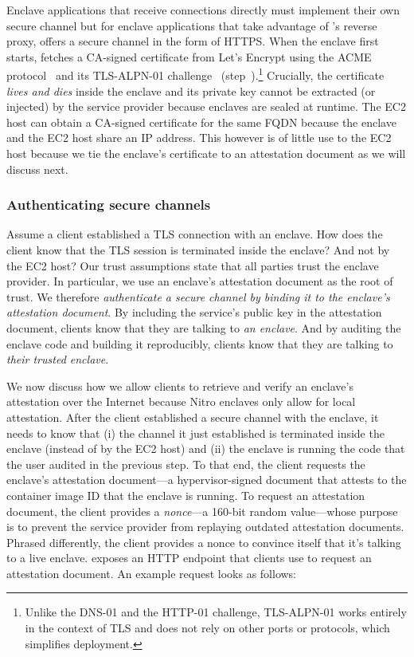 Enclave applications that receive connections directly must implement their own
secure channel but for enclave applications that take advantage of \tool{}'s
reverse proxy, \tool{} offers a secure channel in the form of HTTPS.  When the
enclave first starts, \tool{} fetches a CA-signed certificate from Let's Encrypt
using the ACME protocol~\cite{acme-protocol} and its TLS-ALPN-01
challenge~\cite{tls-alpn} (step~).\footnote{Unlike the DNS-01 and the
HTTP-01 challenge, TLS-ALPN-01 works entirely in the context of TLS and does not
rely on other ports or protocols, which simplifies deployment.}  Crucially, the
certificate \emph{lives and dies} inside the enclave and its private key cannot
be extracted (or injected) by the service provider because enclaves are sealed
at runtime.
%
The EC2 host can obtain a CA-signed certificate for the same FQDN because the
enclave and the EC2 host share an IP address.  This however is of little use to
the EC2 host because we tie the enclave's certificate to an attestation
document as we will discuss next.

\subsubsection{Authenticating secure channels}
\label{sec:attestation}

Assume a client established a TLS connection with an enclave.  How does the
client know that the TLS session is terminated inside the enclave?  And not by
the EC2 host?  Our trust assumptions state that all parties trust the enclave
provider.  In particular, we use an enclave's attestation document as the root
of trust.  We therefore \emph{authenticate a secure channel by binding it to the
enclave's attestation document}.  By including the service's public key in the
attestation document, clients know that they are talking to \emph{an enclave}.
And by auditing the enclave code and building it reproducibly, clients know that
they are talking to \emph{their trusted enclave}.

We now discuss how we allow clients to retrieve and verify an enclave's
attestation over the Internet because Nitro enclaves only allow for local
attestation.  After the client established a secure channel with the enclave, it
needs to know that (i) the channel it just established is terminated
inside the enclave (instead of by the EC2 host) and (ii) the enclave is
running the code that the user audited in the previous step.  To that end, the
client requests the enclave's attestation document---a hypervisor-signed
document that attests to the container image ID that the enclave is running.
To request an attestation document, the client provides a \emph{nonce}---a
160-bit random value---whose purpose is to prevent the service provider from
replaying outdated attestation documents.  Phrased differently, the client
provides a nonce to convince itself that it's talking to a live enclave.
\Tool{} exposes an HTTP endpoint that clients use to request an attestation
document.  An example request looks as follows:

